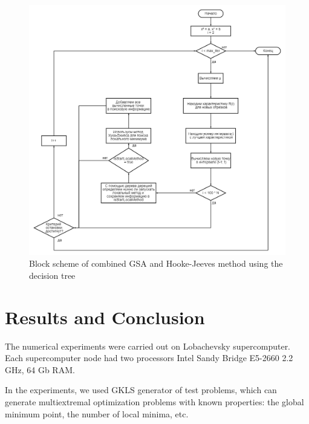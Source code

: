 \documentclass{svproc}
\begin{document}
\begin{figure}[ht!]
	
	\begin{center} 
				\begin{minipage}[h]{0.9\linewidth} 			\includegraphics[width=1\linewidth]{figure/fig3.png}
					 			\caption{Block scheme of combined GSA and Hooke-Jeeves method using the  decision tree} %
				 \end{minipage}
	\end{center}
\end{figure}





\section{Results and Conclusion}\label{SecR}


The numerical experiments were carried out on Lobachevsky supercomputer. Each supercomputer  node had two processors Intel Sandy Bridge E5-2660 2.2 GHz, 64 Gb RAM. 

In the experiments, we used GKLS generator of test problems, which can generate multiextremal  optimization problems with known properties: the global minimum point, the number of local minima,  etc.
\end{document}
